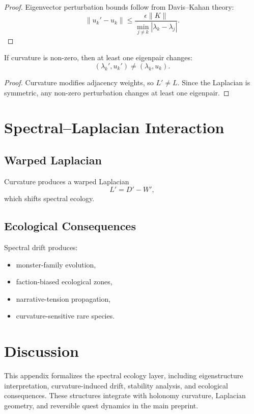 \begin{proof}
Eigenvector perturbation bounds follow from Davis–Kahan theory:
\[
\|u_k' - u_k\|
    \le \frac{\epsilon \|K\|}{\min_{j \neq k} |\lambda_k - \lambda_j|}.
\]
\end{proof}

\begin{theorem}
If curvature is non-zero, then at least one eigenpair changes:
\[
(\lambda_k', u_k') \neq (\lambda_k, u_k).
\]
\end{theorem}

\begin{proof}
Curvature modifies adjacency weights, so $L' \neq L$. Since the Laplacian
is symmetric, any non-zero perturbation changes at least one eigenpair.
\end{proof}

\section{Spectral–Laplacian Interaction}

\subsection{Warped Laplacian}
Curvature produces a warped Laplacian
\[
L' = D' - W',
\]
which shifts spectral ecology.

\subsection{Ecological Consequences}
Spectral drift produces:
\begin{itemize}
    \item monster-family evolution,
    \item faction-biased ecological zones,
    \item narrative-tension propagation,
    \item curvature-sensitive rare species.
\end{itemize}

\section{Discussion}
This appendix formalizes the spectral ecology layer, including
eigenstructure interpretation, curvature-induced drift, stability
analysis, and ecological consequences. These structures integrate with
holonomy curvature, Laplacian geometry, and reversible quest dynamics in
the main preprint.

